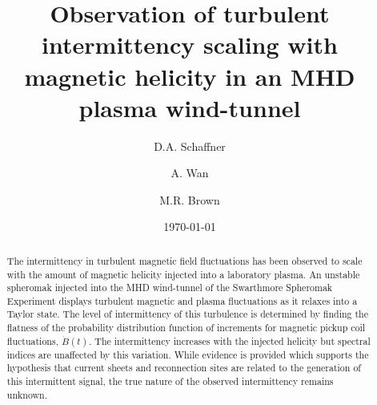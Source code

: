 \documentclass[aps,prl,amsmath,amssymb,reprint,superscriptaddress]{revtex4-1} %
\begin{document}
\title{Observation of turbulent intermittency scaling with magnetic helicity in an MHD plasma wind-tunnel}

\author{D.A. Schaffner}
\author{A. Wan}
\author{M.R. Brown}
\date{\today}
\begin{abstract}
The intermittency in turbulent magnetic field fluctuations has been observed to scale with the amount of magnetic helicity injected into a laboratory plasma. An unstable spheromak injected into the MHD wind-tunnel of the Swarthmore Spheromak Experiment displays turbulent magnetic and plasma fluctuations as it relaxes into a Taylor state. The level of intermittency of this turbulence is determined by finding the flatness of the probability distribution function of increments for magnetic pickup coil fluctuations, $\dot{B}(t)$. The intermittency increases with the injected helicity but spectral indices are unaffected by this variation. While evidence is provided which supports the hypothesis that current sheets and reconnection sites are related to the generation of this intermittent signal, the true nature of the observed intermittency remains unknown.
\end{abstract}

\maketitle
\end{document}
